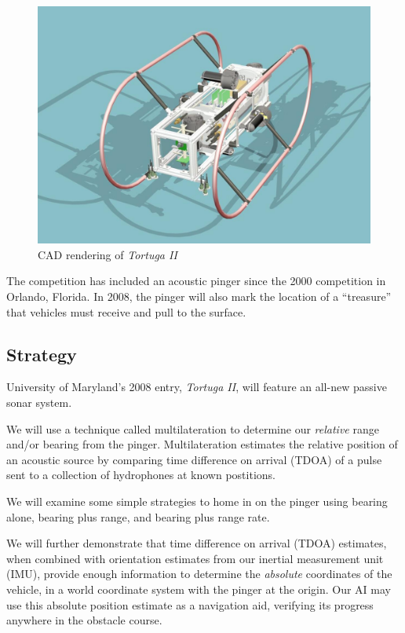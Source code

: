 \documentclass[10pt]{article}
\newcommand{\TortugaII}{\emph{Tortuga II}}
\begin{document}
\begin{figure}[htbp]
\begin{center}
\includegraphics[scale=0.4]{tortuga-perspective.jpg}
\caption{CAD rendering of \TortugaII}
\label{fig:tortuga-render}
\end{center}
\end{figure}

The competition has included an acoustic pinger since the 2000 competition in Orlando, Florida.  In 2008, the pinger will also mark the location of a ``treasure'' that vehicles must receive and pull to the surface.

\subsection{Strategy}

University of Maryland's 2008 entry, \TortugaII, will feature an all-new passive sonar system.

We will use a technique called multilateration to determine our \emph{relative} range and/or bearing from the pinger.  Multilateration estimates the relative position of an acoustic source by comparing time difference on arrival (TDOA) of a pulse sent to a collection of hydrophones at known postitions.

We will examine some simple strategies to home in on the pinger using bearing alone, bearing plus range, and bearing plus range rate.

We will further demonstrate that time difference on arrival (TDOA) estimates, when combined with orientation estimates from our inertial measurement unit (IMU), provide enough information to determine the \emph{absolute} coordinates of the vehicle, in a world coordinate system with the pinger at the origin.  Our AI may use this absolute position estimate as a navigation aid, verifying its progress anywhere in the obstacle course.
\end{document}
